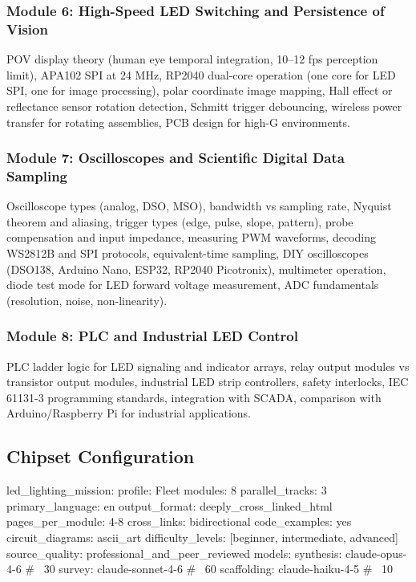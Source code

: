 \documentclass[11pt,letterpaper]{article}
\begin{document}
\subsubsection{Module 6: High-Speed LED Switching and Persistence of Vision}
POV display theory (human eye temporal integration, 10--12 fps perception limit), APA102 SPI at 24 MHz, RP2040 dual-core operation (one core for LED SPI, one for image processing), polar coordinate image mapping, Hall effect or reflectance sensor rotation detection, Schmitt trigger debouncing, wireless power transfer for rotating assemblies, PCB design for high-G environments.

\subsubsection{Module 7: Oscilloscopes and Scientific Digital Data Sampling}
Oscilloscope types (analog, DSO, MSO), bandwidth vs sampling rate, Nyquist theorem and aliasing, trigger types (edge, pulse, slope, pattern), probe compensation and input impedance, measuring PWM waveforms, decoding WS2812B and SPI protocols, equivalent-time sampling, DIY oscilloscopes (DSO138, Arduino Nano, ESP32, RP2040 Picotronix), multimeter operation, diode test mode for LED forward voltage measurement, ADC fundamentals (resolution, noise, non-linearity).

\subsubsection{Module 8: PLC and Industrial LED Control}
PLC ladder logic for LED signaling and indicator arrays, relay output modules vs transistor output modules, industrial LED strip controllers, safety interlocks, IEC 61131-3 programming standards, integration with SCADA, comparison with Arduino/Raspberry Pi for industrial applications.

\subsection{Chipset Configuration}

\begin{asciibox}
led_lighting_mission:
  profile: Fleet
  modules: 8
  parallel_tracks: 3
  primary_language: en
  output_format: deeply_cross_linked_html
  pages_per_module: 4-8
  cross_links: bidirectional
  code_examples: yes
  circuit_diagrams: ascii_art
  difficulty_levels: [beginner, intermediate, advanced]
  source_quality: professional_and_peer_reviewed
  models:
    synthesis:    claude-opus-4-6     # ~30%
    survey:       claude-sonnet-4-6   # ~60%
    scaffolding:  claude-haiku-4-5    # ~10%
\end{asciibox}
\end{document}
